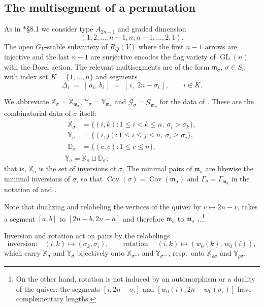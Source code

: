 \documentclass[12pt]{article}
\theoremstyle{definition}
\newcommand{\GL}{\operatorname{GL}}
\newcommand{\mm}{\mathfrak{m}}
\newcommand{\XX}{\mathbb{X}}  %
\newcommand{\YY}{\mathbb{Y}}  %
\newcommand{\DD}{\mathbb{D}}  %
\newcommand{\Kk}{K}         %
\newcommand{\wo}{w_0}                 %
\newcommand{\rc}{\rho}                %
\newcommand{\Gc}{\mathcal{G}}          %
\newcommand{\Cov}{\operatorname{Cov}}  %
\newcommand{\cgr}{\Gamma}                 %
\begin{document}
\subsection{The multisegment of a permutation}\label{ssec:dictionary}

As in \cite{MR1458969}*{\S8.1} we consider type $A_{2n-1}$ and graded dimension
\[
   (1,2,\dots,n-1,n,n-1,\dots,2,1).
\]
The open $G_V$-stable subvariety of $R_Q(V)$ where the first $n-1$ arrows are injective
and the last $n-1$ are surjective encodes the flag variety of $\GL(n)$ with the Borel action.
The relevant multisegments are of the form $\mm_\sigma$, $\sigma \in S_n$
with index set $\Kk = \{1,\dots,n\}$ and segments
\begin{equation}\label{def:mm}
   \Delta_i \;=\; [\,a_i,\,b_i\,] \;=\; [\,i,\; 2n - \sigma_i\,],
   \qquad i \in \Kk .
\end{equation}

We abbreviate $\XX_\sigma = \XX_{\mm_\sigma}$, $\YY_\sigma =
\YY_{\mm_\sigma}$ and $\Gc_\sigma = \Gc_{\mm_\sigma}$ for the data of
. These are the combinatorial data of $\sigma$ itself:
\begin{equation}\label{eq:dictUV}
\begin{gathered}
\begin{aligned}
   \XX_\sigma &= \{(i,k) : 1 \le i < k \le n,\ \sigma_i > \sigma_k\},\\
   \YY_\sigma &= \{(i,j) : 1 \le i \le j \le n,\ \sigma_i \ge \sigma_j\},\\
   \DD_\sigma &= \{(c,c) : 1 \le c \le n\},
\end{aligned}\\[2pt]
   \YY_\sigma = \XX_\sigma \sqcup \DD_\sigma ;
\end{gathered}
\end{equation}
that is, $\XX_\sigma$ is the set of inversions of $\sigma$. The minimal
pairs of $\mm_\sigma$ are likewise the minimal inversions of $\sigma$, so
that $\Cov(\sigma)=\Cov(\mm_\sigma)$ and $\cgr_\sigma=\cgr_{\mm_\sigma}$ in the notation of
 and .


Note that dualizing and relabeling the vertices of the quiver by $v \mapsto 2n-v$,
takes a segment $[a,b]$ to $[2n-b,2n-a]$ and therefore $\mm_\sigma$ to $\mm_{\sigma^{-1}}$.\footnote{On the other hand,
rotation is not induced by an automorphism or a duality of the quiver: the segments $[i,2n-\sigma_i]$ and $[\wo(i),2n-\wo(\sigma_i)]$
have complementary lengths.}

Inversion and rotation act on pairs by the relabelings
\begin{equation}\label{eq:pairsym}
   \text{inversion:}\quad (i,k) \mapsto (\sigma_k,\sigma_i),
   \qquad
   \text{rotation:}\quad (i,k) \mapsto (\wo(k),\,\wo(i)) ,
\end{equation}
which carry $\XX_\sigma$ and $\YY_\sigma$ bijectively onto
$\XX_{\sigma^{-1}}$ and $\YY_{\sigma^{-1}}$, resp.\ onto
$\XX_{\rc\sigma}$ and $\YY_{\rc\sigma}$.
\end{document}
